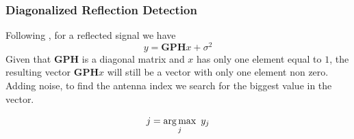 \subsubsection{Diagonalized Reflection Detection}
Following \cite{9328149}, for a reflected signal we have
\begin{equation}
  y = \bm{GPH}x + \sigma^2
\end{equation}
Given that $\bm{GPH}$ is a diagonal matrix and $x$ has only one element equal to $1$, the resulting vector $\bm{GPH}x$ will still be a vector with only one element non zero. Adding noise, to find the antenna index we search for the biggest value in the vector.

\begin{equation}
  j = \operatorname*{arg\,max}_j\ y_j
  \label{eq:reflection_detection}
\end{equation}